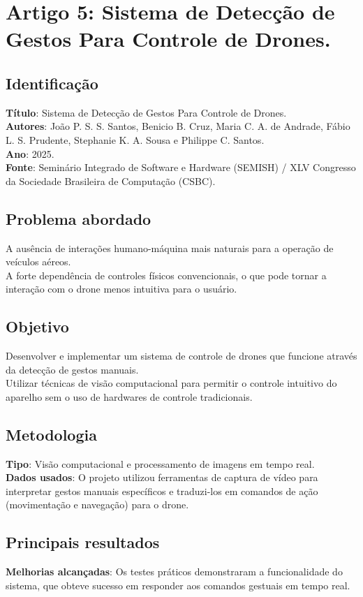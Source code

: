 \documentclass[12pt, a4paper]{article}
\begin{document}
\section{Artigo 5: Sistema de Detecção de Gestos Para Controle de Drones.}
\subsection{Identificação}
\textbf{Título}: Sistema de Detecção de Gestos Para Controle de Drones.\\
\textbf{Autores}: João P. S. S. Santos, Benicio B. Cruz, Maria C. A. de Andrade, Fábio L. S. Prudente, Stephanie K. A. Sousa e Philippe C. Santos.\\
\textbf{Ano}: 2025.\\
\textbf{Fonte}: Seminário Integrado de Software e Hardware (SEMISH) / XLV Congresso da Sociedade Brasileira de Computação (CSBC).\\
\subsection{Problema abordado}
A ausência de interações humano-máquina mais naturais para a operação de veículos aéreos.\\
A forte dependência de controles físicos convencionais, o que pode tornar a interação com o drone menos intuitiva para o usuário.\\
\subsection{Objetivo}
Desenvolver e implementar um sistema de controle de drones que funcione através da detecção de gestos manuais.\\
Utilizar técnicas de visão computacional para permitir o controle intuitivo do aparelho sem o uso de hardwares de controle tradicionais.\\
\subsection{Metodologia}
\textbf{Tipo}: Visão computacional e processamento de imagens em tempo real.\\
\textbf{Dados usados}: O projeto utilizou ferramentas de captura de vídeo para interpretar gestos manuais específicos e traduzi-los em comandos de ação (movimentação e navegação) para o drone.\\
\subsection{Principais resultados}
\textbf{Melhorias alcançadas}: Os testes práticos demonstraram a funcionalidade do sistema, que obteve sucesso em responder aos comandos gestuais em tempo real.\\
\end{document}
